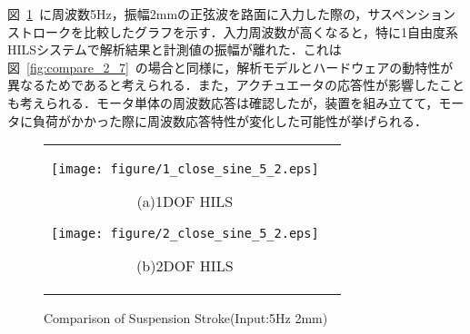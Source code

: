 \documentclass[a4paper,12pt]{article_vdlab_sotsuron}
\begin{document}
\newpage
図~\ref{fig:compare_5_2}~に周波数5Hz，振幅2mmの正弦波を路面に入力した際の，サスペンションストロークを比較したグラフを示す．入力周波数が高くなると，特に1自由度系HILSシステムで解析結果と計測値の振幅が離れた．これは図~\ref{fig:compare_2_7}~の場合と同様に，解析モデルとハードウェアの動特性が異なるためであると考えられる．また，アクチュエータの応答性が影響したことも考えられる．モータ単体の周波数応答は確認したが，装置を組み立てて，モータに負荷がかかった際に周波数応答特性が変化した可能性が挙げられる．

\vspace*{10mm}
\begin{figure}[h]
  \begin{tabular}{cc}
  \begin{minipage}{0.5\hsize}
  \begin{center} 
    \texttt{[image: figure/1\_close\_sine\_5\_2.eps]}
    \end{center}
    \begin{center}
    \vspace*{3mm}
    \ (a)1DOF HILS\
    \end{center}
  \end{minipage}
  \begin{minipage}{0.5\hsize}
     \begin{center}
      \texttt{[image: figure/2\_close\_sine\_5\_2.eps]}
      \end{center}
      \begin{center}
      \vspace*{3mm}
      \ (b)2DOF HILS\
    \end{center}
  \end{minipage}
  \end{tabular}
  \vspace*{3mm}
  \caption{Comparison of Suspension Stroke(Input:5Hz 2mm)}
    \label{fig:compare_5_2}
\end{figure}

\newpage
\end{document}
